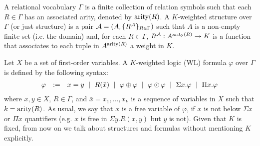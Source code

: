 A relational vocabulary $\Gamma$ is a finite collection of relation symbols such that each $R \in \Gamma$ has an associated arity, denoted by $\operatorname{arity}(R)$.
A $K$-weighted structure over $\Gamma$ (or just structure) is a pair $\mathcal{A} = (A, \{R^{\mathcal{A}}\}_{R \in \Gamma})$ such that $A$ is a non-empty finite set (i.e. the domain) and, for each $R \in \Gamma$, $R^{\mathcal{A}}: A^{\operatorname{arity}(R)} \rightarrow K$ is a function that associates to each tuple in $A^{\operatorname{arity}(R)}$ a weight in $K$.

Let $X$ be a set of first-order variables. A $K$-weighted logic (WL) formula $\varphi$ over $\Gamma$ is defined by the following syntax:
$$
\begin{array}{rcl}
\varphi & := & x = y \ \mid \ R(\bar{x}) \ \mid \ \varphi \ksum \varphi \ \mid \ \varphi \kprod \varphi \ \mid \ \Sigma x. \varphi \ \mid \ \Pi x. \varphi
\end{array}
$$ 
where $x, y \in X$, $R \in \Gamma$, and $\bar{x} = x_1, \ldots, x_k$ is a sequence of variables in $X$ such that $k=\operatorname{arity}(R)$. As usual, we say that $x$ is a free variable of $\varphi$, if $x$ is not below $\Sigma x$ or $\Pi x$ quantifiers (e.g. $x$ is free in $\Sigma y. R(x,y)$ but $y$ is not). 
Given that $K$ is fixed, from now on we talk about structures and formulas without mentioning $K$ explicitly.  

